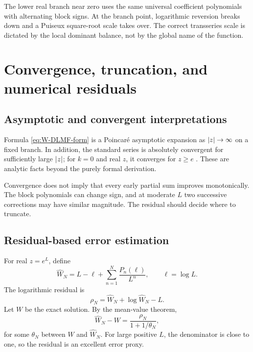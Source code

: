 \documentclass[11pt,openany]{book}
\theoremstyle{definition}
\theoremstyle{plain}
\theoremstyle{remark}
\DeclarePairedDelimiter{\abs}{\lvert}{\rvert}
\begin{document}
\begin{summarybox}
The lower real branch near zero uses the same universal coefficient polynomials with alternating block signs. At the branch point, logarithmic reversion breaks down and a Puiseux square-root scale takes over. The correct transseries scale is dictated by the local dominant balance, not by the global name of the function.
\end{summarybox}

\chapter{Convergence, truncation, and numerical residuals}\label{ch:W-numerics}

\section{Asymptotic and convergent interpretations}
Formula \cref{eq:W-DLMF-form} is a Poincar\'e asymptotic expansion as \(\abs{z}\to\infty\) on a fixed branch. In addition, the standard series is absolutely convergent for sufficiently large \(\abs z\); for \(k=0\) and real \(z\), it converges for \(z\ge e\) \cite{dlmf-W,corless-W}. These are analytic facts beyond the purely formal derivation.

Convergence does not imply that every early partial sum improves monotonically. The block polynomials can change sign, and at moderate \(L\) two successive corrections may have similar magnitude. The residual should decide where to truncate.

\section{Residual-based error estimation}
For real \(z=e^L\), define
\[
 \widehat W_N=L-\ell+\sum_{n=1}^N\frac{P_n(\ell)}{L^n},
 \qquad \ell=\log L.
\]
The logarithmic residual is
\begin{equation}\label{eq:numeric-residual}
 \rho_N=\widehat W_N+\log\widehat W_N-L.
\end{equation}
Let \(W\) be the exact solution. By the mean-value theorem,
\begin{equation}\label{eq:residual-error-relation}
 \widehat W_N-W
 =\frac{\rho_N}{1+1/\theta_N},
\end{equation}
for some \(\theta_N\) between \(W\) and \(\widehat W_N\). For large positive \(L\), the denominator is close to one, so the residual is an excellent error proxy.
\end{document}
